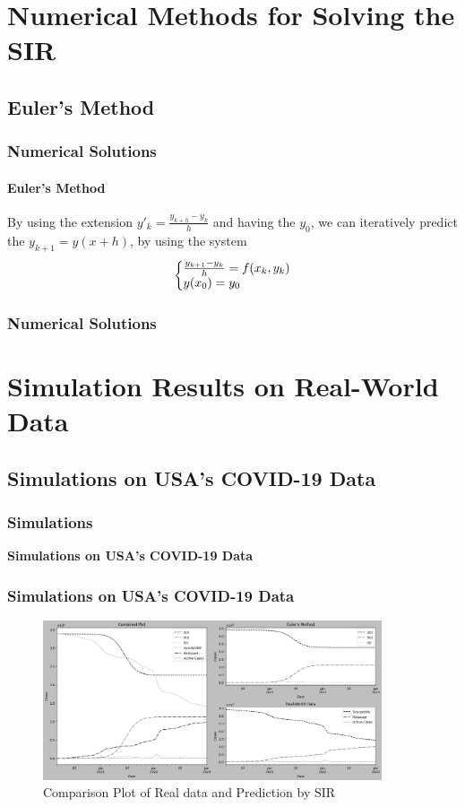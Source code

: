 \documentclass{beamer}
\makeatletter
\newenvironment{system}%
{\left\lbrace\begin{array}{@{}l@{}}}%
{\end{array}\right.}
\makeatother
\begin{document}
\section{Numerical Methods for Solving the SIR}
\subsection{Euler's Method}
\begin{frame}\frametitle{Numerical Solutions}
\framesubtitle  {Euler's Method}
    By using the extension $y'_k=\frac{y_{k+h}-y_k}{h}$ and having the
$y_0$, we can iteratively predict the $y_{k+1}=y(x+h)$, by using the system
\large
\begin{equation*}
    \begin{system}
        \frac{y_{k+1}-y_k}{h}=f(x_k, y_k)
        \\
        y(x_0)=y_0
    \end{system}
\end{equation*}

\end{frame}\frametitle{Numerical Solutions}

\begin{frame}

\end{frame}

\section{Simulation Results on Real-World Data}
\subsection{Simulations on USA's COVID-19 Data}
\begin{frame}\frametitle{Simulations}
    \begin{center}
        \textbf{Simulations on USA's COVID-19 Data}
    \end{center}
\end{frame}

\begin{frame}\frametitle{Simulations on USA's COVID-19 Data}
    \begin{figure}
        \caption{Comparison Plot of Real data and Prediction by SIR}
        \centering
        \includegraphics[width=10cm]{Figure_USAPredict.png}
    \end{figure}
\end{frame}
\end{document}
